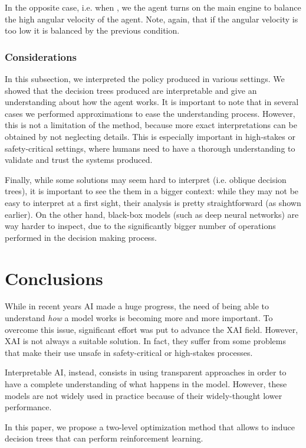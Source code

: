 \documentclass[review,english]{elsarticle}
\begin{document}
In the opposite case, i.e. when , we the agent turns on the main engine to balance the high angular velocity of the agent. Note, again, that if the angular velocity is too low it is balanced by the previous condition.

\subsubsection{Considerations}
In this subsection, we interpreted the policy produced in various settings. 
We showed that the decision trees produced are interpretable and give an understanding about how the agent works.
It is important to note that in several cases we performed approximations to ease the understanding process. 
However, this is not a limitation of the method, because more exact interpretations can be obtained by not neglecting details.
This is especially important in high-stakes or safety-critical settings, where humans need to have a thorough understanding to validate and trust the systems produced.

Finally, while some solutions may seem hard to interpret (i.e. oblique decision trees), it is important to see the them in a bigger context: while they may not be easy to interpret at a first sight, their analysis is pretty straightforward (as shown earlier).
On the other hand, black-box models (such as deep neural networks) are way harder to inspect, due to the significantly bigger number of operations performed in the decision making process.

\section{Conclusions}
\label{sec:conclusions}
While in recent years AI made a huge progress, the need of being able to understand \textit{how} a model works is becoming more and more important.
To overcome this issue, significant effort was put to advance the XAI field.
However, XAI is not always a suitable solution.
In fact, they suffer from some problems that make their use unsafe in safety-critical or high-stakes processes.

Interpretable AI, instead, consists in using transparent approaches in order to have a complete understanding of what happens in the model. 
However, these models are not widely used in practice because of their widely-thought lower performance.

In this paper, we propose a two-level optimization method that allows to induce decision trees that can perform reinforcement learning.
\end{document}
